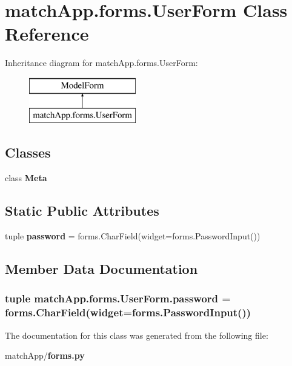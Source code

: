 \section{match\+App.\+forms.\+User\+Form Class Reference}
\label{classmatch_app_1_1forms_1_1_user_form}
Inheritance diagram for match\+App.\+forms.\+User\+Form\+:\begin{figure}[H]
\begin{center}
\leavevmode
\includegraphics[height=2.000000cm]{classmatch_app_1_1forms_1_1_user_form}
\end{center}
\end{figure}
\subsection*{Classes}
\begin{DoxyCompactItemize}
\item 
class {\bf Meta}
\end{DoxyCompactItemize}
\subsection*{Static Public Attributes}
\begin{DoxyCompactItemize}
\item 
tuple {\bf password} = forms.\+Char\+Field(widget=forms.\+Password\+Input())
\end{DoxyCompactItemize}


\subsection{Member Data Documentation}
\subsubsection[{password}]{\setlength{\rightskip}{0pt plus 5cm}tuple match\+App.\+forms.\+User\+Form.\+password = forms.\+Char\+Field(widget=forms.\+Password\+Input())\hspace{0.3cm}{\ttfamily [static]}}\label{classmatch_app_1_1forms_1_1_user_form_a22fba20516b0361b6db1a96fc08c5053}


The documentation for this class was generated from the following file\+:\begin{DoxyCompactItemize}
\item 
match\+App/{\bf forms.\+py}\end{DoxyCompactItemize}
